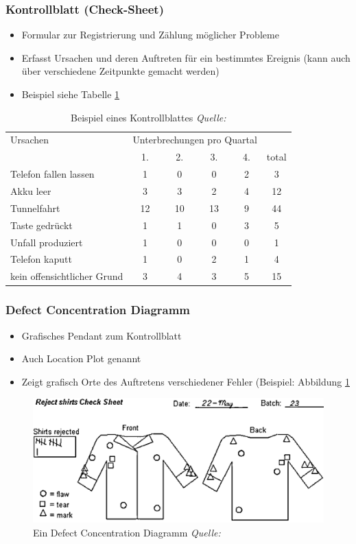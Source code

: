 \subsubsection{Kontrollblatt (Check-Sheet)}
\label{subsubsec:Kontrollblatt}
\begin{itemize}
	\item Formular zur Registrierung und Zählung möglicher Probleme
	\item Erfasst Ursachen und deren Auftreten für ein bestimmtes Ereignis (kann auch über verschiedene Zeitpunkte gemacht werden)
	\item Beispiel siehe Tabelle \ref{tab:CheckSheet}
\end{itemize}

\begin{table}[h!]
	\centering
	\begin{tabular}{l | c c c c | c}
		Ursachen					& \multicolumn{4}{c}{Unterbrechungen pro Quartal} 	&\\
									&1.		&2.		& 3.	&4.							&total\\\hline
		Telefon fallen lassen		&1		&0		&0		&2							&3\\
		Akku leer					&3		&3		&2		&4							&12\\
		Tunnelfahrt					&12		&10		&13		&9							&44\\
		Taste gedrückt				&1		&1		&0		&3							&5\\
		Unfall produziert			&1		&0		&0		&0							&1\\
		Telefon kaputt				&1		&0		&2		&1							&4\\
		kein offensichtlicher Grund	&3		&4		&3		&5							&15
	\end{tabular}
	\label{tab:CheckSheet}
	\caption{Beispiel eines Kontrollblattes \textit{Quelle:} \cite{C:CurtisSkriptCause}}
\end{table}


\subsubsection{Defect Concentration Diagramm}
\label{subsubsec:DefectConcentrationDiagramm}
\begin{itemize}
	\item Grafisches Pendant zum Kontrollblatt
	\item Auch Location Plot genannt
	\item Zeigt grafisch Orte des Auftretens verschiedener Fehler (Beispiel: Abbildung \ref{fig:DefectConcentration}
\end{itemize}
\begin{figure}[!h]
	\centering
	\includegraphics[width=0.5\linewidth]{figures/DefectConcentration}
	\caption{Ein Defect Concentration Diagramm \textit{Quelle:}\cite{C:DefectConcentration}}
	\label{fig:DefectConcentration}
\end{figure}

